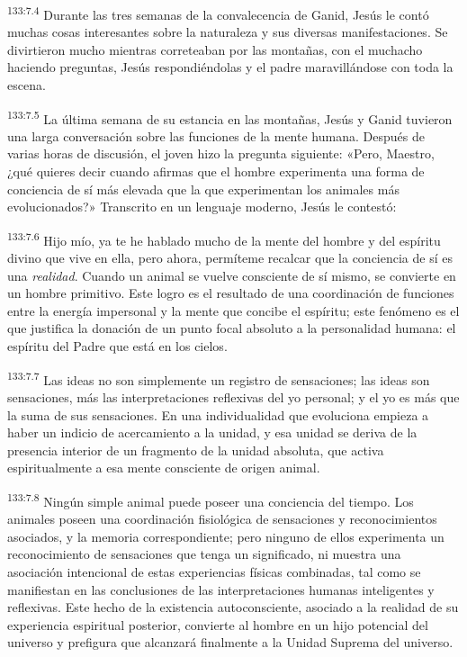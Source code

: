 \par 
\textsuperscript{133:7.4} Durante las tres semanas de la convalecencia de Ganid, Jesús le contó muchas cosas interesantes sobre la naturaleza y sus diversas manifestaciones. Se divirtieron mucho mientras correteaban por las montañas, con el muchacho haciendo preguntas, Jesús respondiéndolas y el padre maravillándose con toda la escena.

\par 
\textsuperscript{133:7.5} La última semana de su estancia en las montañas, Jesús y Ganid tuvieron una larga conversación sobre las funciones de la mente humana. Después de varias horas de discusión, el joven hizo la pregunta siguiente: «Pero, Maestro, ¿qué quieres decir cuando afirmas que el hombre experimenta una forma de conciencia de sí más elevada que la que experimentan los animales más evolucionados?» Transcrito en un lenguaje moderno, Jesús le contestó:

\par 
\textsuperscript{133:7.6} Hijo mío, ya te he hablado mucho de la mente del hombre y del espíritu divino que vive en ella, pero ahora, permíteme recalcar que la conciencia de sí es una \textit{realidad}. Cuando un animal se vuelve consciente de sí mismo, se convierte en un hombre primitivo. Este logro es el resultado de una coordinación de funciones entre la energía impersonal y la mente que concibe el espíritu; este fenómeno es el que justifica la donación de un punto focal absoluto a la personalidad humana: el espíritu del Padre que está en los cielos.

\par 
\textsuperscript{133:7.7} Las ideas no son simplemente un registro de sensaciones; las ideas son sensaciones, más las interpretaciones reflexivas del yo personal; y el yo es más que la suma de sus sensaciones. En una individualidad que evoluciona empieza a haber un indicio de acercamiento a la unidad, y esa unidad se deriva de la presencia interior de un fragmento de la unidad absoluta, que activa espiritualmente a esa mente consciente de origen animal.

\par 
\textsuperscript{133:7.8} Ningún simple animal puede poseer una conciencia del tiempo. Los animales poseen una coordinación fisiológica de sensaciones y reconocimientos asociados, y la memoria correspondiente; pero ninguno de ellos experimenta un reconocimiento de sensaciones que tenga un significado, ni muestra una asociación intencional de estas experiencias físicas combinadas, tal como se manifiestan en las conclusiones de las interpretaciones humanas inteligentes y reflexivas. Este hecho de la existencia autoconsciente, asociado a la realidad de su experiencia espiritual posterior, convierte al hombre en un hijo potencial del universo y prefigura que alcanzará finalmente a la Unidad Suprema del universo.

